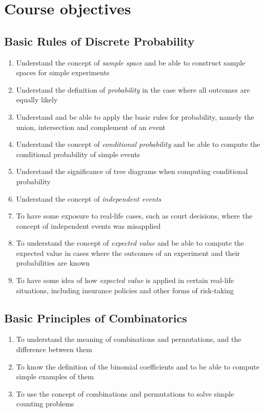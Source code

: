 \documentclass[11pt]{article}
\begin{document}
\section{Course objectives}
\subsection{Basic Rules of Discrete Probability}
\begin{enumerate}
\item Understand the concept of {\em sample space} and be able to construct sample spaces for simple experiments
\item Understand the definition of {\em probability} in the case where all outcomes are equally likely
\item Understand and be able to apply the basic rules for probability,
namely the union, intersection and complement of an event
\item Understand the concept of {\em conditional probability}
and be able to compute the conditional probability of simple events
\item Understand the significance of tree diagrams
when computing conditional probability
\item Understand the concept of {\em independent events}
\item To have some exposure to real-life cases, such as court decisions,
where the concept of independent events was misapplied
\item To understand the concept of {\em expected value}
and be able to compute the expected value in cases where the
outcomes of an experiment and their probabilities are known
\item To have some idea of how {\em expected value}
is applied in certain real-life situations,
including insurance policies and other forms of risk-taking
\end{enumerate}
\subsection{Basic Principles of Combinatorics}
\begin{enumerate}
\item To understand the meaning of combinations and permutations,
and the difference between them
\item To know the definition of the binomial coefficients
and to be able to compute simple examples of them
\item To use the concept of combinations and permutations
to solve simple counting problems
\end{enumerate}
\end{document}
